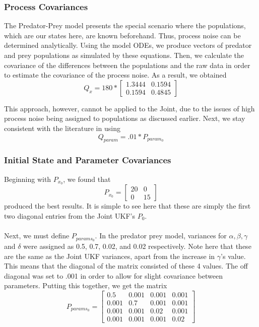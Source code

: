 \subsubsection{Process Covariances}
The Predator-Prey model presents the special scenario where the populations, which are our states here, are known beforehand. Thus, process noise can be determined analytically. Using the model ODEs, we produce vectors of predator and prey populations as simulated by these equations. Then, we calculate the covariance of the differences between the populations and the raw data in order to estimate the covariance of the process noise. As a result, we obtained
$$Q_{x} = 180 * \begin{bmatrix} 1.3444 & 0.1594\\ 0.1594 & 0.4845\end{bmatrix} $$

This approach, however, cannot be applied to the Joint, due to the issues of high process noise being assigned to populations as discussed earlier. Next, we stay consistent with the literature in using
$$ Q_{param} = .01 * P_{param_0} $$


\subsubsection{Initial State and Parameter Covariances}
Beginning with $P_{x_0}$, we found that
$$P_{x_0} = \begin{bmatrix}
20 & 0\\0 & 15\end{bmatrix}$$
produced the best results. It is simple to see here that these are simply the first two diagonal entries from the Joint UKF's $P_0$. \\
\\
Next, we must define $P_{params_0}$. In the predator prey model, variances for $\alpha, \beta, \gamma$ and $\delta$ were assigned as 0.5, 0.7, 0.02, and 0.02 respectively. Note here that these are the same as the Joint UKF variances, apart from the increase in $\gamma$'s value. This means that the diagonal of the matrix consisted of these 4 values. The off diagonal was set to .001 in order to allow for slight covariance between parameters. Putting this together, we get the matrix
$$P_{params_0} = \begin{bmatrix} 0.5 & 0.001 & 0.001 & 0.001 \\
                                0.001 & 0.7 & 0.001 & 0.001 \\
                                0.001 & 0.001 & 0.02 & 0.001 \\
                                0.001 & 0.001 & 0.001 & 0.02 \end{bmatrix} $$
                                

